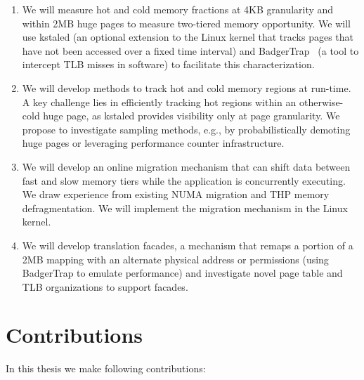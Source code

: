 \begin{enumerate}
\item
We will measure hot and cold memory fractions at 4KB granularity and within 2MB
huge pages to measure two-tiered memory opportunity. We will use kstaled (an
optional extension to the Linux kernel that tracks pages that have not been
accessed over a fixed time interval) and BadgerTrap~\cite{badgertrap} (a tool to
intercept TLB misses in software) to facilitate this characterization. 

\item
We will develop methods to track hot and cold memory regions at run-time.  A
key challenge lies in efficiently tracking hot regions within an otherwise-cold
huge page, as kstaled provides visibility only at page granularity.  We propose
to investigate sampling methods, e.g., by probabilistically demoting huge pages
or leveraging performance counter infrastructure. 

\item
We will develop an online migration mechanism that can shift data between
fast and slow memory tiers while the application is concurrently executing.  We
draw experience from existing NUMA migration and THP memory defragmentation. We
will implement the migration mechanism in the Linux kernel.

\item
We will develop translation facades, a mechanism that remaps a
portion of a 2MB mapping with an alternate physical address or permissions
(using BadgerTrap to emulate performance) and investigate novel page table and
TLB organizations to support facades.
\end{enumerate}

\section{Contributions}
In this thesis we make following contributions:

